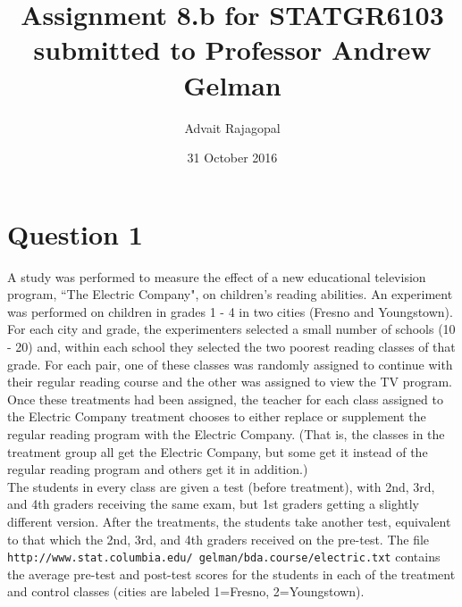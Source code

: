 \documentclass{article}
\title{Assignment 8.b for \textbf{STATGR6103}\\
\large submitted to Professor Andrew Gelman}
\date{31 October 2016}
\author{Advait Rajagopal}
\begin{document}
  \maketitle
\section{Question 1}
A study was performed to measure the effect of a new educational television program, ``The Electric Company", on children's reading abilities. An experiment was performed on children in grades 1 - 4 in two cities (Fresno and Youngstown). For each city and grade, the experimenters selected a small number of schools (10 - 20) and, within each school they selected the two poorest reading classes of that grade. For each pair, one of these classes was randomly assigned to continue with their regular reading course and the other was assigned to view the TV program. Once these treatments had been assigned, the teacher for each class assigned to the Electric Company treatment chooses to either replace or supplement the regular reading program with the Electric Company. (That is, the classes in the treatment group all get the Electric Company, but some get it instead of the regular reading program and others get it in addition.)\\
The students in every class are given a test (before treatment), with 2nd, 3rd, and 4th graders receiving the same exam, but 1st graders getting a slightly different version. After the treatments, the students take another test, equivalent to that which the 2nd, 3rd, and 4th graders received on the pre-test. The file \texttt{http://www.stat.columbia.edu/~gelman/bda.course/electric.txt} contains the average pre-test and post-test scores for the students in each of the treatment and control classes (cities are labeled 1=Fresno, 2=Youngstown).
\end{document}
